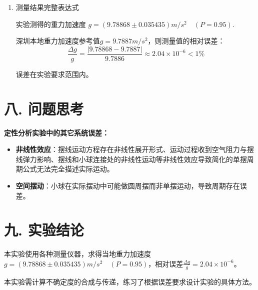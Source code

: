 \documentclass[12pt,a4paper]{article}
\begin{document}
\begin{enumerate}
	故：
	
	\[ u_{0.95}(l) = \sqrt{(2.78\times 0.14493)^2 + (1.96\times 0.03144)^2} \approx 0.2437cm  \]
	
	\[ u_{0.95}(d) = \sqrt{(2.78\times 0.00447)^2 + (1.65\times 0.01633)^2} \approx 0.01795mm  \]
	
	\[ u_{0.95}(t) = \sqrt{(2.78\times 0.01166)^2 + (1.96\times 0.06675)^2} \approx 0.02067s  \]
	
	\textbf{重力加速度的不确定度：}
	
	根据不确定度的传递公式：
	
	$$ u_{0.95}(L) =  \sqrt{u_{0.95}^2(l) + (\frac{1}{2}u_{0.95}(d))^2} = \sqrt{2.437^2 + (\frac{1}{2}\times 0.01795)^2} \approx 2.437mm $$
	
	$$ \frac{u_{0.95}(g)}{g} = 	\sqrt{(\frac{u_{0.95}(l)}{\bar{l}})^2 + (\frac{2u_{0.95}(t)}{\bar{t}})^2} = \sqrt{(\frac{2.437}{679.58})^2 + (\frac{2\times 0.02067}{83.348})^2} \approx 0.003620 $$
	
	则

	$$ u_{0.95}(g) = 0.003620 \times 9.78868  \approx 0.035435m/s^2 $$
	
	\item 测量结果完整表达式
	
	实验测得的重力加速度 $g = (9.78868  \pm 0.035435)m/s^2\quad (P=0.95)$.
	
	深圳本地重力加速度参考值$g = 9.7887m/s^2$，则测量值的相对误差：
	$$ \frac{\Delta g}{g} = \frac{|9.78868-9.7887|}{9.7886} \approx 2.04\times 10^{-6} < 1\% $$

	误差在实验要求范围内。

	\end{enumerate}

	\section*{\textbf{{八. 问题思考}}}
	\textbf{定性分析实验中的其它系统误差：}
		\begin{itemize}
			\item \textbf{非线性效应}：摆线运动方程存在非线性展开形式、运动过程收到空气阻力与摆线弹力影响、摆线和小球连接处的非线性运动等非线性效应导致简化的单摆周期公式无法完全描述实际运动。
			\item \textbf{空间摆动}：小球在实际摆动中可能做圆周摆而非单摆运动，导致周期存在误差。
		\end{itemize}
	
	\section*{\textbf{{九. 实验结论}}}
	
	本实验使用各种测量仪器，求得当地重力加速度 $g = (9.78868 \pm 0.035435)m/s^2\quad (P=0.95)$，相对误差$\frac{\Delta g}{g} = 2.04\times 10^{-6}$。

	本实验需计算不确定度的合成与传递，练习了根据误差要求设计实验的具体方法。
	
	
\end{document}
